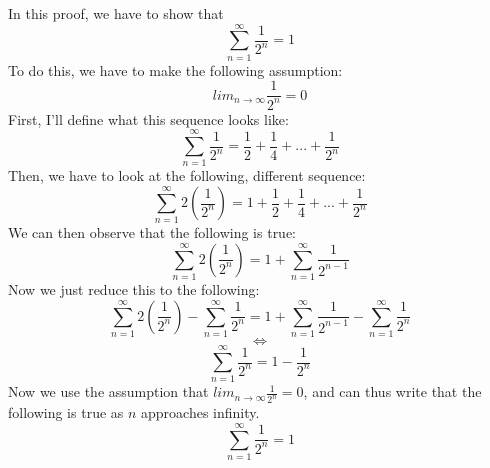 In this proof, we have to show that
$$
\sum_{n=1}^\infty \frac{1}{2^n}= 1
$$
To do this, we have to make the following assumption:
$$
lim_{n \to \infty} \frac{1}{2^n} = 0
$$
First, I'll define what this sequence looks like:
$$
\sum_{n=1}^\infty \frac{1}{2^n} = \frac{1}{2}+ \frac{1}{4}+ ... + \frac{1}{2^n}
$$
Then, we have to look at the following, different sequence:
$$
\sum_{n=1}^\infty 2(\frac{1}{2^n}) = 1+ \frac{1}{2}+ \frac{1}{4}+ ... + \frac{1}{2^n}
$$
We can then observe that the following is true:
$$
\sum_{n=1}^\infty 2(\frac{1}{2^n}) =1+ \sum_{n=1}^\infty \frac{1}{2^{n-1}}
$$
Now we just reduce this to the following:
$$
\sum_{n=1}^\infty 2(\frac{1}{2^n})-\sum_{n=1}^\infty \frac{1}{2^n} = 1 + \sum_{n=1}^\infty \frac{1}{2^{n-1}} - \sum_{n=1}^\infty \frac{1}{2^n}
$$
$$\iff$$
$$
\sum_{n=1}^\infty \frac{1}{2^n} = 1 - \frac{1}{2^n}
$$
Now we use the assumption that $lim_{n \to \infty} \frac{1}{2^n} = 0$, and can thus write that the following is true as $n$ approaches infinity.
$$
\sum_{n=1}^\infty \frac{1}{2^n} = 1
$$
